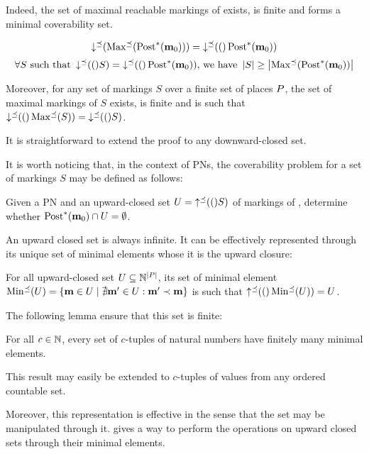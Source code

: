 Indeed, the set of maximal reachable markings of \namePN exists, is finite and forms a minimal coverability set.

\[\operatorname{\downarrow^\preceq}(\operatorname{Max^\preceq}(\operatorname{Post}^*(\mathbf{m}_0))) = \operatorname{\downarrow^\preceq}(()\operatorname{Post}^*(\mathbf{m}_0))\]
\[\forall S \text{ such that } \operatorname{\downarrow^\preceq}(()S) = \operatorname{\downarrow^\preceq}(()\operatorname{Post}^*(\mathbf{m}_0))\text{, we have } \left|S\right| \geq \left|\operatorname{Max^\preceq}(\operatorname{Post}^*(\mathbf{m}_0))\right|\]

Moreover, for any set of markings $S$ over a finite set of places $P$, the set of maximal markings of $S$ exists, is finite and is such that $\operatorname{\downarrow^\preceq}(()\operatorname{Max^\preceq}(S)) = \operatorname{\downarrow^\preceq}(()S)$.


It is straightforward to extend the proof to any downward-closed set.

It is worth noticing that, in the context of \acp{PN}, the coverability problem for a set of markings $S$ may be defined as follows:
\begin{defi}
  \label{defi:upclocovprblm}
  Given a \ac{PN} \namePN and an upward-closed set $U = \operatorname{\uparrow^\preceq}(()S)$ of markings of \namePN, determine whether $\operatorname{Post}^*(\mathbf{m}_0) \cap U = \emptyset$.
\end{defi}

An upward closed set is always infinite.
It can be effectively represented through its unique set of minimal elements whose it is the upward closure:
\begin{lemm}
  For all upward-closed set $U \subseteq \mathbb{N}^{\left|P\right|}$, its set of minimal element $\operatorname{Min^\preceq}(U) = \{\mathbf{m} \in U \mid \nexists \mathbf{m}' \in U : \mathbf{m}' \prec \mathbf{m}\}$ is such that $\operatorname{\uparrow^\preceq}(()\operatorname{Min^\preceq}(U)) = U$.
\end{lemm}

The following lemma ensure that this set is finite:
\begin{lemm}
  For all $c \in \mathbb{N}$, every set of $c$-tuples of natural numbers have finitely many minimal elements.
\end{lemm}
This result may easily be extended to $c$-tuples of values from any ordered countable set.

Moreover, this representation is effective in the sense that the set may be manipulated through it.
\cite{Ganty09} gives a way to perform the operations on upward closed sets through their minimal elements.

